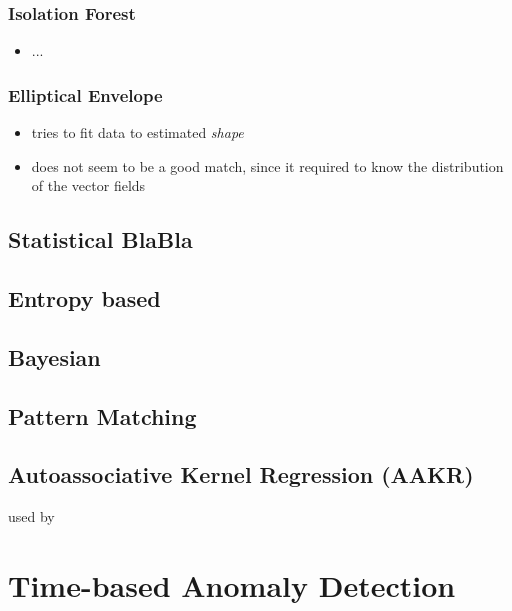 	\subsubsection{Isolation Forest}
	\begin{itemize}
		\item ...
	\end{itemize}
	
	\subsubsection{Elliptical Envelope}
	\begin{itemize}
		\item tries to fit data to estimated \emph{shape}
		\item does not seem to be a good match, since it required to know the distribution of the vector fields
	\end{itemize}

	\subsection{Statistical BlaBla}
	\subsection{Entropy based}
	\subsection{Bayesian}
	\subsection{Pattern Matching}
	\subsection{Autoassociative Kernel Regression (AAKR)}
		used by \textcite{Yang2006}

\section{Time-based Anomaly Detection}

